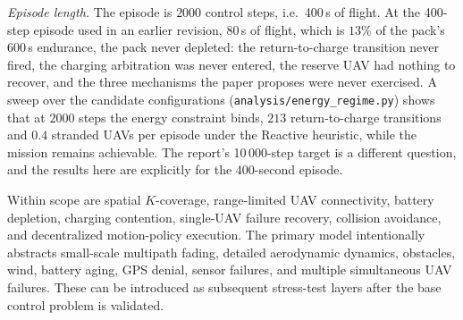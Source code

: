 \documentclass[conference]{IEEEtran}
\newcommand{\tokEpisodeSeconds}{400}
\newcommand{\tokEpisodeSteps}{2000}
\newcommand{\tokOldEpisodePct}{13}
\newcommand{\tokOldEpisodeS}{80}
\newcommand{\tokPackEndurance}{600}
\newcommand{\tokReactRet}{213}
\newcommand{\tokReactStr}{0.4}
\begin{document}
\emph{Episode length.} The episode is $\tokEpisodeSteps$ control steps, i.e.\ \tokEpisodeSeconds\,s of flight. At the 400-step episode used in an earlier revision, \tokOldEpisodeS\,s of flight, which is $\tokOldEpisodePct\%$ of the pack's $\tokPackEndurance$\,s endurance, the pack never depleted: the return-to-charge transition never fired, the charging arbitration was never entered, the reserve UAV had nothing to recover, and the three mechanisms the paper proposes were never exercised. A sweep over the candidate configurations (\texttt{analysis/energy\_regime.py}) shows that at $\tokEpisodeSteps$ steps the energy constraint binds, $\tokReactRet$ return-to-charge transitions and $\tokReactStr$ stranded UAVs per episode under the Reactive heuristic, while the mission remains achievable. The report's 10\,000-step target is a different question, and the results here are explicitly for the \tokEpisodeSeconds-second episode.

Within scope are spatial $K$-coverage, range-limited UAV connectivity, battery depletion, charging contention, single-UAV failure recovery, collision avoidance, and decentralized motion-policy execution. The primary model intentionally abstracts small-scale multipath fading, detailed aerodynamic dynamics, obstacles, wind, battery aging, GPS denial, sensor failures, and multiple simultaneous UAV failures. These can be introduced as subsequent stress-test layers after the base control problem is validated.
\end{document}
